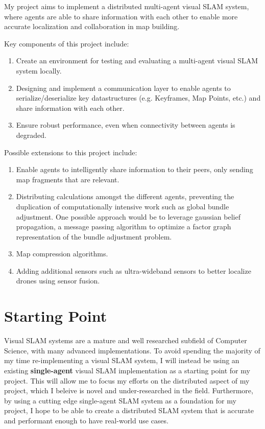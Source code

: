 \documentclass[12pt,a4paper,twoside]{article}
\begin{document}
My project aims to implement a distributed multi-agent visual SLAM system, where agents are able to share information with each other to enable more accurate localization and collaboration in map building.

Key components of this project include:
\begin{enumerate}
    \item Create an environment for testing and evaluating a multi-agent visual SLAM system locally.
    \item Designing and implement a communication layer to enable agents to serialize/deserialize key datastructures (e.g. Keyframes, Map Points, etc.) and share information with each other.
    \item Ensure robust performance, even when connectivity between agents is degraded.
\end{enumerate}


Possible extensions to this project include:
\begin{enumerate}
    \item \label{extension:intelligentSharing} Enable agents to intelligently share information to their peers, only sending map fragments that are relevant.
    \item \label{extension:distributedComputation} Distributing calculations amongst the different agents, preventing the duplication of computationally intensive work such as global bundle adjustment. One possible approach would be to leverage gaussian belief propagation, a message passing algorithm to optimize a factor graph representation of the bundle adjustment problem.
    \item \label{extension:mapCompression} Map compression algorithms.
    \item \label{extension:extraSensors} Adding additional sensors such as ultra-wideband sensors to better localize drones using sensor fusion.
\end{enumerate}

\newpage

\section{Starting Point}

Visual SLAM systems are a mature and well researched subfield of Computer Science, with many advanced implementations. To avoid spending the majority of my time re-implementing a visual SLAM system, I will instead be using an existing \textbf{single-agent} visual SLAM implementation as a starting point for my project. This will allow me to focus my efforts on the distributed aspect of my project, which I beleive is novel and under-researched in the field. Furthermore, by using a cutting edge single-agent SLAM system as a foundation for my project, I hope to be able to create a distributed SLAM system that is accurate and performant enough to have real-world use cases.
\end{document}
